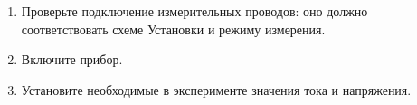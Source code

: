 \begin{enumerate}

\item Проверьте подключение измерительных проводов: оно должно соответствовать схеме Установки и режиму измерения.
\item Включите прибор.
\item Установите необходимые в эксперименте значения тока и напряжения.

\end{enumerate}
